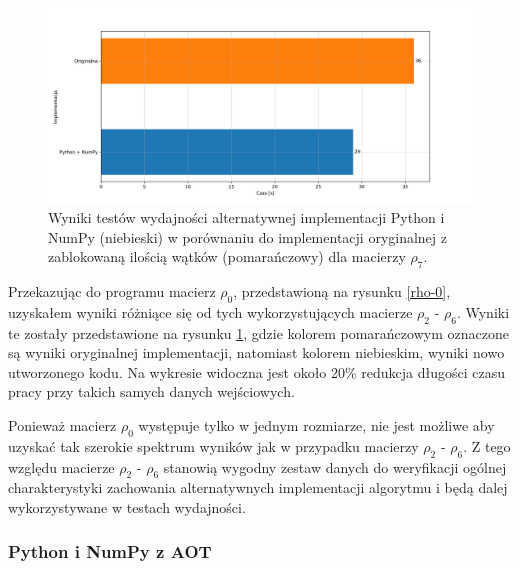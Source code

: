 \documentclass[10pt, a4paper]{article}
\begin{document}
\begin{sloppypar}
    \begin{figure}[ht]
      \centering
      \includegraphics[width=1.0\textwidth]{"resources/benchmark_2/plot2.png"}
      \caption{Wyniki testów wydajności alternatywnej implementacji Python i NumPy (niebieski) w porównaniu do implementacji oryginalnej z zablokowaną ilością wątków (pomarańczowy) dla macierzy $\rho
      _{7}$.}
      \label{first-alt-perf}
    \end{figure}
    \FloatBarrier

    Przekazując do programu macierz $\rho_{0}$, przedstawioną na rysunku \ref{rho-0}, uzyskałem
    wyniki różniące się od tych wykorzystujących macierze $\rho_{2}$ - $\rho_{6}$.
    Wyniki te zostały przedstawione na rysunku \ref{first-alt-perf}, gdzie kolorem pomarańczowym
    oznaczone są wyniki oryginalnej implementacji, natomiast kolorem niebieskim, wyniki nowo
    utworzonego kodu. Na wykresie widoczna jest około 20\% redukcja długości czasu pracy
    przy takich samych danych wejściowych.

    Ponieważ macierz $\rho_{0}$ występuje tylko w jednym rozmiarze, nie jest możliwe aby
    uzyskać tak szerokie spektrum wyników jak w przypadku macierzy $\rho_{2}$ -
    $\rho_{6}$. Z tego względu macierze $\rho_{2}$ - $\rho_{6}$ stanowią wygodny zestaw danych
    do weryfikacji ogólnej charakterystyki zachowania alternatywnych implementacji algorytmu
    i będą dalej wykorzystywane w testach wydajności.

    \newpage


    \subsubsection{ Python i NumPy z AOT }



\end{sloppypar}
\end{document}
